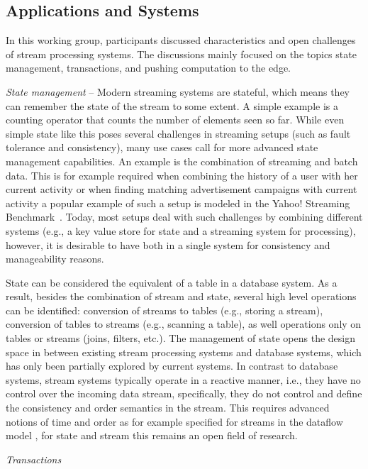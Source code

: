 \subsection{Applications and Systems}

In this working group, participants discussed characteristics and open 
challenges of stream processing systems. The discussions mainly focused on 
the topics state management, transactions, and pushing computation to the edge.

\emph{State management} -- Modern streaming systems are stateful, which means they can remember the state 
of the stream to some extent. A simple example is a counting operator that 
counts the number of elements seen so far. While even simple state like this 
poses several challenges in streaming setups (such as fault tolerance and 
consistency), many use cases call for more advanced state management 
capabilities. An example is the combination of streaming and batch data. This
is for example required when combining the history of a user with her current
activity or when finding matching advertisement campaigns with current activity
a popular example of such a setup is modeled in the Yahoo! Streaming 
Benchmark~\cite{Chintapalli2016BenchmarkingSC}. Today, most setups deal with
such challenges by combining different systems (e.g., a key value store for
state and a streaming system for processing), however, it is desirable to have 
both in a single system for consistency and manageability reasons. 

State can be considered the equivalent of a table in a database system. As a 
result, besides the combination of stream and state, several high level
operations can be identified: conversion of streams to tables (e.g., storing 
a stream), conversion of tables to streams (e.g., scanning a table), as well 
operations only on tables or streams (joins, filters, etc.). The management of 
state opens the design space in between existing stream processing systems and 
database systems, which has only been partially explored by current systems.
In contrast to database systems, stream systems typically operate in a reactive
manner, i.e., they have no control over the incoming data stream, specifically, 
they do not control and define the consistency and order semantics in the 
stream. This requires advanced notions of time and order as for example 
specified for streams in the dataflow model \cite{43864}, for state and stream
this remains an open field of research. 


\emph{Transactions}

